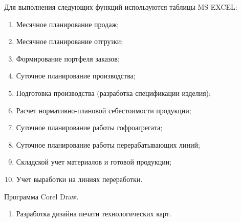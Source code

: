 Для выполнения следующих функций используются таблицы MS EXCEL:
\begin{enumerate}
\item Месячное планирование продаж;
\item Месячное планирование отгрузки;
\item Формирование портфеля заказов;
\item Суточное планирование производства;
\item Подготовка производства (разработка спецификации изделия);
\item Расчет нормативно-плановой себестоимости продукции;
\item Суточное планирование работы гофроагрегата;
\item Суточное планирование работы перерабатывающих линий;
\item Складской учет материалов и готовой продукции;
\item Учет выработки на линиях переработки.
\end{enumerate}


Программа Corel Draw.
\begin{enumerate}
\item Разработка дизайна печати технологических карт.


\end{enumerate}



